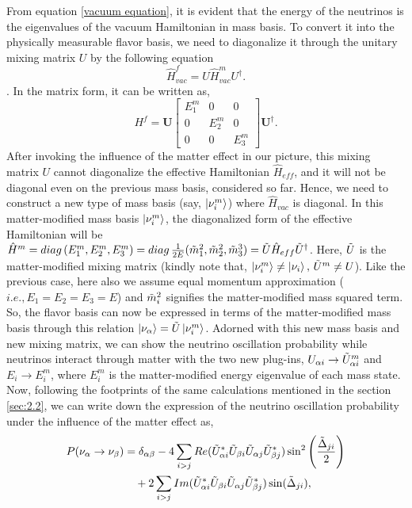  From equation \ref{vacuum equation}, it is evident that the energy of the neutrinos is the eigenvalues of the vacuum Hamiltonian in mass basis. To convert it into the physically measurable flavor basis, we need to diagonalize it through the unitary mixing matrix $U$ by the following equation
\begin{equation}
    \hat{H}^f_{vac}= U\hat{H}^m_{vac}U^\dagger.
\end{equation}. 
In the matrix form, it can be written as,
\begin{equation}
    H^f = \mathbf{U}
    \begin{bmatrix}
        E_1^m & 0 & 0 \\
        0 & E_2^m & 0 \\
        0 & 0 & E_3^m
    \end{bmatrix}
    \mathbf{U}^\dagger.
\end{equation}
After invoking the influence of the matter effect in our picture, this mixing matrix $U$ cannot diagonalize the effective Hamiltonian $\hat{H}_{eff}$, and it will not be diagonal even on the previous mass basis, considered so far. Hence, we need to construct a new type of mass basis (say, $\ket{\nu^m_i}$) where $\hat{H}_{vac}$ is diagonal. In this matter-modified mass basis $\ket{\nu^m_i}$, the diagonalized form of the effective Hamiltonian will be $\hat{H}^m=diag\, (E^m_1, E^m_2, E^m_3)= diag\, \frac{1}{2E}(\Tilde{m}^2_1, \Tilde{m}^2_2, \Tilde{m}^3_3)=\Tilde{U}\hat{H}_{eff} \Tilde{U}^\dagger$. Here, $\Tilde{U}$ is the matter-modified mixing matrix (kindly note that, $\ket{\nu^m_i}\neq\ket{\nu_i},\,\Tilde{U}^m\neq U$). Like the previous case, here also we assume equal momentum approximation ($i.e., E_1=E_2=E_3=E$) and $\Tilde{m}^2_i$ signifies the matter-modified mass squared term. So, the flavor basis can now be expressed in terms of the matter-modified mass basis through this relation $\ket{\nu_\alpha}=\Tilde{U}\ket{\nu^m_i}$. Adorned with this new mass basis and new mixing matrix, we can show the neutrino oscillation probability while neutrinos interact through matter with the two new plug-ins, $U_{\alpha i}\rightarrow \Tilde{U}^m_{\alpha i}$ and $E_i\rightarrow E^m_i$, where $E^m_i$ is the matter-modified energy eigenvalue of each mass state. Now, following the footprints of the same calculations mentioned in the section \ref{sec:2.2}, we can write down the expression of the neutrino oscillation probability under the influence of the matter effect as,
\begin{align}
    P(\nu_\alpha \rightarrow \nu_\beta) &= \delta_{\alpha\beta} 
    - 4\sum_{i>j} Re (\Tilde{U}^*_{\alpha i} \Tilde{U}_{\beta i}\Tilde{U}_{\alpha j}\Tilde{U}^*_{\beta j}) \sin^2\left(\frac{\Tilde{\Delta}_{ji}}{2}\right) \nonumber \\
    &\quad + 2\sum_{i>j} Im (\Tilde{U}^*_{\alpha i} \Tilde{U}_{\beta i}\Tilde{U}_{\alpha j}\Tilde{U}^*_{\beta j}) \sin(\Tilde{\Delta}_{ji}), \label{eq: matt modified oscillation probability}
\end{align}
